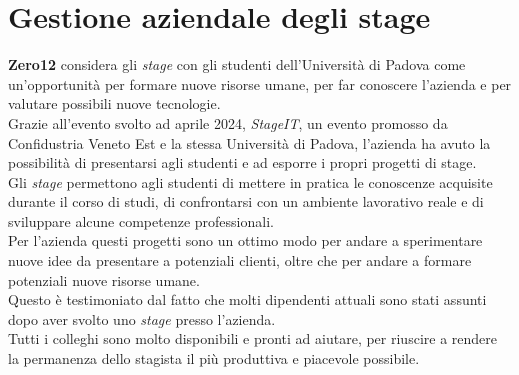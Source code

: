 \section{Gestione aziendale degli stage}
\label{sez:gestione-aziendale-stage}

\textbf{Zero12} considera gli \textit{stage} con gli studenti dell'Università di Padova come un'opportunità per formare nuove risorse umane, 
per far conoscere l'azienda e per valutare possibili nuove tecnologie.\\
Grazie all'evento svolto ad aprile 2024, \textit{StageIT}, un evento promosso da Confidustria Veneto Est e la stessa Università di Padova,
l'azienda ha avuto la possibilità di presentarsi agli studenti e ad esporre i propri progetti di stage.\\

\noindent Gli \textit{stage} permettono agli studenti di mettere in pratica le conoscenze acquisite durante il corso di studi, di confrontarsi con un ambiente lavorativo reale e di
sviluppare alcune competenze professionali.\\
Per l'azienda questi progetti sono un ottimo modo per andare a sperimentare nuove idee da presentare a potenziali clienti, oltre che per andare
a formare potenziali nuove risorse umane.\\
Questo è testimoniato dal fatto che molti dipendenti attuali sono stati assunti dopo aver svolto uno \textit{stage} presso l'azienda.\\
Tutti i colleghi sono molto disponibili e pronti ad aiutare, per riuscire a rendere la permanenza dello stagista il più produttiva e piacevole possibile.\\